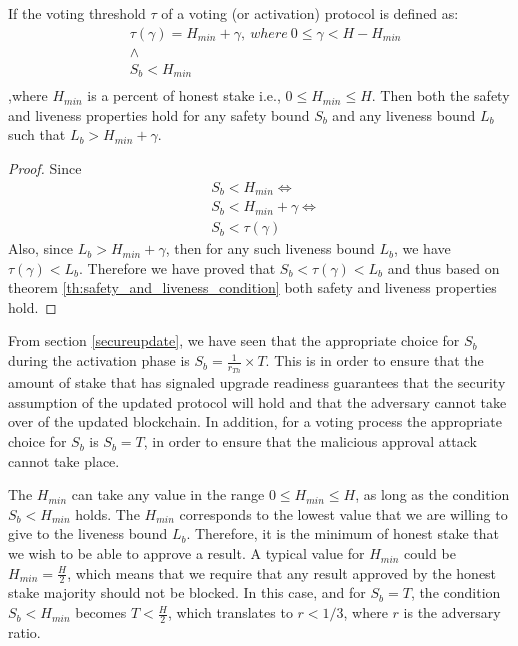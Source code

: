\begin{theorem}\label{th:proposed_voting_threshold}
	If the voting threshold $\tau$ of a voting (or activation) protocol is 
	defined as:
	\begin{align*}
		&\tau(\gamma) = H_{min} + \gamma,\ where\ 0 \leq \gamma < H-H_{min} \\
		&\land\\
		&S_b < H_{min}\\
	\end{align*}
,where $H_{min}$ is a percent of honest stake i.e., $0 \leq H_{min} \leq H$. 
Then both the safety and liveness properties hold for any safety bound 
	$S_b$ and any liveness bound $L_b$ such that $L_b > H_{min} + \gamma$.
	\begin{proof}
		Since 
		\begin{align*}
			&S_b < H_{min} \iff\\
			&S_b < H_{min} + \gamma \iff\\
			&S_b < \tau(\gamma)
		\end{align*}
		Also, since $L_b > H_{min} + \gamma$, then for any such liveness bound 
		$L_b$, we have $\tau(\gamma) < L_b$.
		Therefore we have proved that $S_b < \tau(\gamma) < L_b$ and thus 
		based on theorem \ref{th:safety_and_liveness_condition} both safety and 
		liveness properties hold.
	\end{proof}
\end{theorem}

From section \ref{secureupdate}, we have seen that the appropriate choice for 
$S_b$ during the activation phase is $S_b = \frac{1}{r_{Th}}\times T$. This is 
in order to ensure that the amount of stake that has signaled upgrade readiness 
guarantees that the security assumption of the updated protocol will hold and 
that the adversary cannot take over of the updated blockchain. In addition, for 
a voting process the appropriate choice for $S_b$ is $S_b = T$, in order to 
ensure that the malicious approval attack cannot take place.

The $H_{min}$ can take any value in the range $0 \leq H_{min} \leq H$, as long 
as 
the condition $S_b < H_{min}$ holds. The $H_{min}$ corresponds to the lowest 
value 
that we are willing to give to the liveness bound $L_b$. Therefore, it is the 
minimum of honest stake that we wish to be able to approve a result. A typical 
value for 
$H_{min}$ could 
be $H_{min} = \frac{H}{2}$, which means that we require that any result 
approved by the honest stake majority should not be blocked. In this case, and 
for 
$S_b = T$, the condition $S_b < H_{min}$ becomes $T < \frac{H}{2}$, which 
translates to $r < 1/3$, where $r$ is the adversary ratio. 

